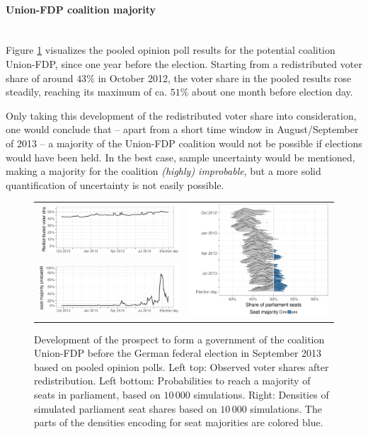 \documentclass[smallcondensed]{svjour3}     %
\begin{document}
\paragraph{Union-FDP coalition majority} \ \\
Figure \ref{fig:2013_cdufdp} visualizes the pooled opinion poll results
for the potential coalition Union-FDP, since one year before the election.
Starting from a redistributed voter share of around $43\%$ in October 2012,
the voter share in the pooled results rose steadily, reaching its maximum
of ca. $51\%$ about one month before election day.

Only taking this development of the redistributed voter share into
consideration, one would conclude that -- apart from a short
time window in August/September of 2013 -- a majority of the Union-FDP
coalition would not be possible if elections would have been held.
In the best case, sample uncertainty would be mentioned, making
a majority for the coalition {\it (highly) improbable}, but a more
solid quantification of uncertainty is not easily possible.

\begin{figure}[H]\centering
\begin{tabular}{ll}
\includegraphics[height=.15\textwidth]{figures/2013_pooled_cdufdp_rawSharesRedist.pdf}
&
\multirow{2}{*}[13ex]{\includegraphics[height=.3\textwidth]{figures/2013_pooled_cdufdp_ridgeline.pdf}}
\\
\includegraphics[height=.15\textwidth]{figures/2013_pooled_cdufdp_prob.pdf}
\end{tabular}
\caption{Development of the prospect to form a government of the coalition Union-FDP before the German federal election in September 2013 based on pooled opinion polls.
Left top: Observed voter shares after redistribution. Left bottom: Probabilities to reach a majority of seats in parliament, based on $10\,000$ simulations. Right: Densities of simulated parliament seat shares based on $10\,000$ simulations. The parts of the densities encoding for seat majorities are colored blue.
\label{fig:2013_cdufdp}
}
\end{figure}
\end{document}
